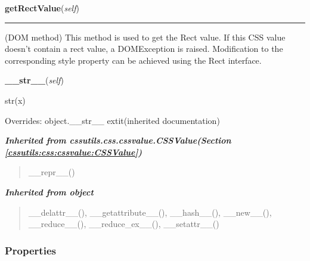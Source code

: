 \hspace{.8\funcindent}\begin{boxedminipage}{\funcwidth}

    \raggedright \textbf{getRectValue}(\textit{self})

    \vspace{-1.5ex}

    \rule{\textwidth}{0.5\fboxrule}
\setlength{\parskip}{2ex}

(DOM method) This method is used to get the Rect value. If this CSS
value doesn't contain a rect value, a DOMException is raised.
Modification to the corresponding style property can be achieved
using the Rect interface.
\setlength{\parskip}{1ex}
    \end{boxedminipage}

    \vspace{0.5ex}

\hspace{.8\funcindent}\begin{boxedminipage}{\funcwidth}

    \raggedright \textbf{\_\_str\_\_}(\textit{self})

\setlength{\parskip}{2ex}
    str(x)

\setlength{\parskip}{1ex}
      Overrides: object.\_\_str\_\_ 	extit{(inherited documentation)}

    \end{boxedminipage}


\large{\textbf{\textit{Inherited from cssutils.css.cssvalue.CSSValue\textit{(Section \ref{cssutils:css:cssvalue:CSSValue})}}}}

\begin{quote}
\_\_repr\_\_()
\end{quote}

\large{\textbf{\textit{Inherited from object}}}

\begin{quote}
\_\_delattr\_\_(), \_\_getattribute\_\_(), \_\_hash\_\_(), \_\_new\_\_(), \_\_reduce\_\_(), \_\_reduce\_ex\_\_(), \_\_setattr\_\_()
\end{quote}


  \subsubsection{Properties}

